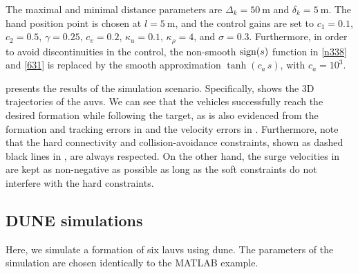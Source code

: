 The maximal and minimal distance parameters are $\Delta_k=\SI{50}{\meter}$ and $\delta_k=\SI{5}{\meter}$.
The hand position point is chosen at $l=\SI{5}{\meter}$, and the control gains are set to $c_1=0.1$, $c_2=0.5$, $\gamma=0.25$, $c_v=0.2$, $\kappa_u=0.1$, $\kappa_\rho=4$, and $\sigma=0.3$.
Furthermore, in order to avoid discontinuities in the control, the non-smooth ${\rm sign}(s)$ function in \eqref{n338} and \eqref{631} is replaced by the smooth approximation $\tanh\left(c_a\, s\right)$, with $c_a = 10^3$.

 presents the results of the simulation scenario.
Specifically,  shows the 3D trajectories of the \glspl{auv}.
We can see that the vehicles successfully reach the desired formation while following the target, as is also evidenced from the formation and tracking errors in  and the velocity errors in .
Furthermore, note that the hard connectivity and collision-avoidance constraints, shown as dashed black lines in , are always respected.
On the other hand, the surge velocities in  are kept as non-negative as possible as long as the soft constraints do not interfere with the hard constraints.

\subsection{DUNE simulations}

Here, we simulate a formation of six \glspl{lauv} using \gls{dune}.
The parameters of the simulation are chosen identically to the MATLAB example.

